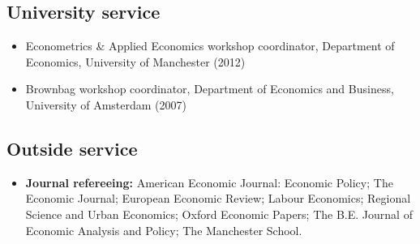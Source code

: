 \documentclass[11pt]{article}
\begin{document}
{%



\subsection*{\sc University service}
\begin{itemize}[leftmargin=20pt]
    \itemsep-.1cm
    \item[] Econometrics \& Applied Economics workshop coordinator, Department of Economics, University of Manchester (2012)
    \item[] Brownbag workshop coordinator, Department of Economics and Business, University of Amsterdam (2007)
\end{itemize}

\subsection*{\sc Outside service}

\begin{itemize}[itemsep=.9pt, leftmargin=20pt]
    \item[]\textbf{Journal refereeing:} American Economic Journal: Economic Policy; The Economic Journal; European Economic Review; Labour Economics; Regional Science and Urban Economics; Oxford Economic Papers; The B.E. Journal of Economic Analysis and Policy; The Manchester School.
\end{itemize}

}
\end{document}
